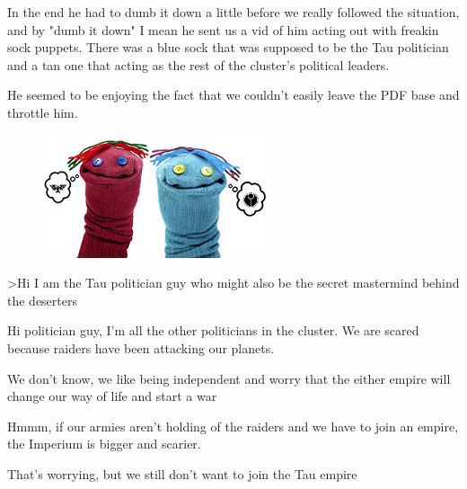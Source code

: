 In the end he had to dumb it down a little before we really followed the situation, and by "dumb it down" I mean he sent us a vid of him acting out with freakin sock puppets. 
There was a blue sock that was supposed to be the Tau politician and a tan one that acting as the rest of the cluster's political leaders.

He seemed to be enjoying the fact that we couldn't easily leave the PDF base and throttle him.

\begin{figure}
	\begin{center}
		\includegraphics[width=\figwidth]{pics/10/48.png}
	\end{center}
\end{figure}
>Hi I am the Tau politician guy who might also be the secret mastermind behind the deserters

Hi politician guy, I'm all the other politicians in the cluster. 
We are scared because raiders have been attacking our planets.



We don't know, we like being independent and worry that the either empire will change our way of life and start a war



Hmmm, if our armies aren't holding of the raiders and we have to join an empire, the Imperium is bigger and scarier.



That's worrying, but we still don't want to join the Tau empire



